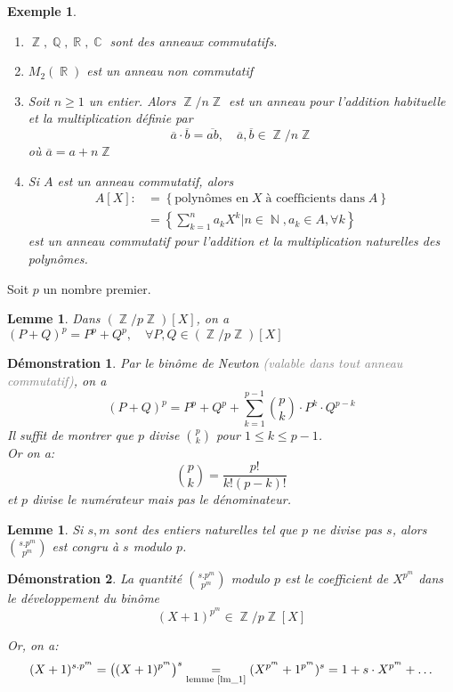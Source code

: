 \documentclass[a4paper, oneside]{report}
\theoremstyle{break}
\newtheorem{lemme}[thm]{Lemme}
\newtheorem{exemple}[thm]{Exemple}
\newtheorem*{demonstration}{Démonstration}
\newcommand{\gray}[1]{\textcolor{gray}{#1}}
\DeclareMathOperator{\R}{\mathbb{R}}
\DeclareMathOperator{\N}{\mathbb{N}}
\DeclareMathOperator{\C}{\mathbb{C}}
\DeclareMathOperator{\Z}{\mathbb{Z}}
\DeclareMathOperator{\Q}{\mathbb{Q}}
\DeclarePairedDelimiter\ens{\left\{ }{\right\} }%
\DeclarePairedDelimiter\pa{\big(}{\big)}%
\renewcommand{\ens}[1]{\left\{ #1 \right\} }%
\newcommand{\us}{\underset}
\newcommand{\ol}{\overline}
\newcommand{\ensem}{\ens}
\begin{document}
\begin{exemple}
\begin{enumerate}
\item  $\Z, \Q, \R, \C$ sont des anneaux commutatifs.

\medbreak

\item $M_2(\R)$ est un anneau non commutatif

\medbreak

\item Soit $n \geq 1$ un entier. Alors $\Z/n\Z$ est un anneau pour l'addition habituelle et la multiplication définie par 
\[
\ol{a} \cdot \ol{b} = \ol{ab},		\quad	\ol{a}, \ol{b} \in \Z/n\Z
\]
où $\ol{a} = a + n \Z$

\medbreak

\item Si $A$ est un anneau commutatif, alors
\begin{align*}
A[X] :&= \ens{\text{polynômes en} \; X \; \text{à coefficients dans} \; A}
\\
&= \ensem{\sum_{k = 1}^n a_k X^k \big| n \in \N, a_k \in A, \forall k}
\end{align*}
est un anneau commutatif pour l'addition et la multiplication naturelles des polynômes.\\
\end{enumerate}
\end{exemple}

\noindent Soit $p$ un nombre premier.
\begin{lemme}
\label{lm_1}
Dans $(\Z/p\Z)[X]$, on a $(P + Q)^p = P^p + Q^p,	\quad	\forall P, Q \in (\Z/p\Z)[X]$
\end{lemme}

\begin{demonstration}
Par le binôme de Newton \gray{(valable dans tout anneau commutatif)}, on a 
\[
(P + Q)^p = P^p + Q^p + \sum_{k = 1}^{p-1} \binom{p}{k} \cdot P^k \cdot Q^{p-k}
\]
Il suffit de montrer que $p$ divise $\binom{p}{k}$ pour $1 \leq k \leq p - 1$.\\
Or on a:
\[
\binom{p}{k} = \frac{p!}{k! (p-k)!}
\]
et $p$ divise le numérateur mais pas le dénominateur.
\end{demonstration}

\begin{lemme}
Si $s, m$ sont des entiers naturelles tel que $p$ ne divise pas $s$, alors $\binom{s.p^m}{p^m}$ est congru à $s$ modulo $p$.
\end{lemme}

\begin{demonstration}
La quantité $\binom{s.p^m}{p^m}$ modulo $p$ est le coefficient de $X^{p^m}$ dans le développement du binôme 
\[
(X + 1)^{p^m} \in \Z/p\Z[X]
\]

Or, on a:
\[
(X + 1)^{s.p^m} = \pa{(X+1)^{p^m}}^s \us{\text{lemme \ref{lm_1}}}{=} (X^{p^m} + 1^{p^m})^s = 1 + s \cdot X^{p^m} + \ldots 
\]
\end{demonstration}
\end{document}
